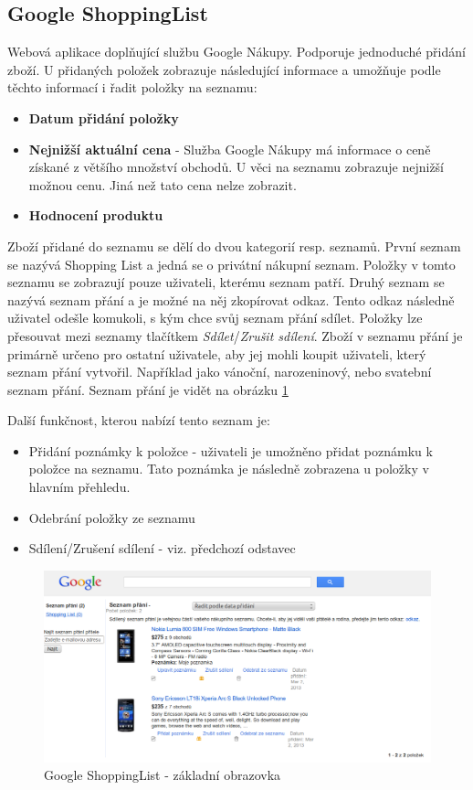 \subsection{Google ShoppingList}
Webová aplikace doplňující službu Google Nákupy. Podporuje jednoduché přidání zboží. U přidaných položek zobrazuje následující informace a umožňuje podle těchto informací i řadit položky na seznamu:
\begin{itemize}
\item \textbf{Datum přidání položky}
\item \textbf{Nejnižší aktuální cena} - Služba Google Nákupy má informace o ceně získané z většího množství obchodů. U věci na seznamu zobrazuje nejnižší možnou cenu. Jiná než tato cena nelze zobrazit.
\item \textbf{Hodnocení produktu}
\end{itemize}
Zboží přidané do seznamu se dělí do dvou kategorií resp. seznamů. První seznam se nazývá Shopping List a jedná se o privátní nákupní seznam. Položky v tomto seznamu se zobrazují pouze uživateli, kterému seznam patří. Druhý seznam se nazývá seznam přání a je možné na něj zkopírovat odkaz. Tento odkaz následně uživatel odešle komukoli, s kým chce svůj seznam přání sdílet. Položky lze přesouvat mezi seznamy tlačítkem \emph{Sdílet}/\emph{Zrušit sdílení}.
Zboží v seznamu přání je primárně určeno pro ostatní uživatele, aby jej mohli koupit uživateli, který seznam přání vytvořil. Například jako vánoční, narozeninový, nebo svatební seznam přání. Seznam přání je vidět na obrázku \ref{fig:google-shoppinglist}

Další funkčnost, kterou nabízí tento seznam je:
\begin{itemize}
\item Přidání poznámky k položce - uživateli je umožněno přidat poznámku k položce na seznamu.  Tato poznámka je následně zobrazena u položky v hlavním přehledu.
\item Odebrání položky ze seznamu
\item Sdílení/Zrušení sdílení - viz. předchozí odstavec
\end{itemize}

\begin{figure}[htb]
\begin{center}
\includegraphics[width=120mm]{./pictures/google-shopping-list.png}
\caption{Google ShoppingList - základní obrazovka}
\label{fig:google-shoppinglist}
\end{center}
\end{figure}

